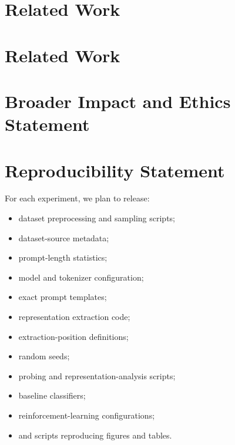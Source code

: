 \documentclass[11pt]{article}
\begin{document}
\section{Related Work}\section{Related Work}

%
%
%
%
%
%
%


\section{Broader Impact and Ethics Statement}



\section{Reproducibility Statement}

For each experiment, we plan to release:

\begin{itemize}

    \item dataset preprocessing and sampling scripts;

    \item dataset-source metadata;

    \item prompt-length statistics;

    \item model and tokenizer configuration;

    \item exact prompt templates;

    \item representation extraction code;

    \item extraction-position definitions;

    \item random seeds;

    \item probing and representation-analysis scripts;

    \item baseline classifiers;

    \item reinforcement-learning configurations;

    \item and scripts reproducing figures and tables.

\end{itemize}
\end{document}
